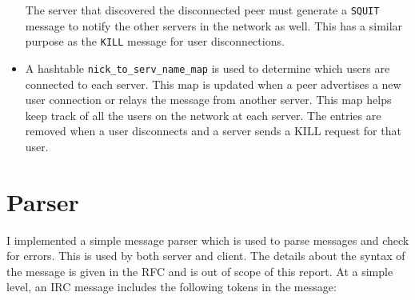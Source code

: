 \documentclass[letterpaper,twocolumn,10pt]{article}
\begin{document}
\begin{itemize}
	      The server that
	      discovered
	      the disconnected peer must generate a \verb|SQUIT| message to notify
	      the other
	      servers in the network as well. This has a similar purpose as the
	      \verb|KILL|
	      message for user disconnections.
	\item A hashtable \verb|nick_to_serv_name_map| is used to determine which
	      users are
	      connected to each server. This map is updated when a peer advertises a
	      new user
	      connection or relays the message from another server. This map helps
	      keep track
	      of all the users on the network at each server. The entries are removed
	      when a
	      user disconnects and a server sends a KILL request for that user.

\end{itemize}

\section{Parser}

I implemented a simple message parser which is used to parse messages and check
for errors. This is used by both server and client. The details about the
syntax of the message is given in the RFC and is out of scope of this report.
At a simple level, an IRC message includes the following tokens in the message:
\end{document}

